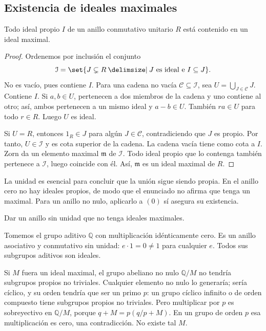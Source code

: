 \subsection{Existencia de ideales maximales}\label{tema:17-2-2}
\begin{prop}\label{prop:C17-maximales}
Todo ideal propio $I$ de un anillo conmutativo unitario $R$ está contenido en un ideal maximal.
\end{prop}
\begin{proof}
Ordenemos por inclusión el conjunto
\[
\mathcal I=\set{J\subsetneq R\given J\text{ es ideal e }I\subseteq J}.
\]
No es vacío, pues contiene $I$. Para una cadena no vacía $\mathcal C\subseteq\mathcal I$, sea $U=\bigcup_{J\in\mathcal C}J$. Contiene $I$. Si $a,b\in U$, pertenecen a dos miembros de la cadena y uno contiene al otro; así, ambos pertenecen a un mismo ideal y $a-b\in U$. También $ra\in U$ para todo $r\in R$. Luego $U$ es ideal.

Si $U=R$, entonces $1_R\in J$ para algún $J\in\mathcal C$, contradiciendo que $J$ es propio. Por tanto, $U\in\mathcal I$ y es cota superior de la cadena. La cadena vacía tiene como cota a $I$. Zorn da un elemento maximal $\mathfrak m$ de $\mathcal I$. Todo ideal propio que lo contenga también pertenece a $\mathcal I$, luego coincide con él. Así, $\mathfrak m$ es un ideal maximal de $R$.
\end{proof}
La unidad es esencial para concluir que la unión sigue siendo propia. En el anillo cero no hay ideales propios, de modo que el enunciado no afirma que tenga un maximal. Para un anillo no nulo, aplicarlo a $(0)$ sí asegura su existencia.

\begin{ejer}\label{ejer:C17-sin-unidad}
Dar un anillo sin unidad que no tenga ideales maximales.
\end{ejer}
\begin{sol}
Tomemos el grupo aditivo $\mathbb Q$ con multiplicación idénticamente cero. Es un anillo asociativo y conmutativo sin unidad: $e\cdot1=0\ne1$ para cualquier $e$. Todos sus subgrupos aditivos son ideales.

Si $M$ fuera un ideal maximal, el grupo abeliano no nulo $\mathbb Q/M$ no tendría subgrupos propios no triviales. Cualquier elemento no nulo lo generaría; sería cíclico, y su orden tendría que ser un primo $p$: un grupo cíclico infinito o de orden compuesto tiene subgrupos propios no triviales. Pero multiplicar por $p$ es sobreyectivo en $\mathbb Q/M$, porque $q+M=p(q/p+M)$. En un grupo de orden $p$ esa multiplicación es cero, una contradicción. No existe tal $M$.
\end{sol}
